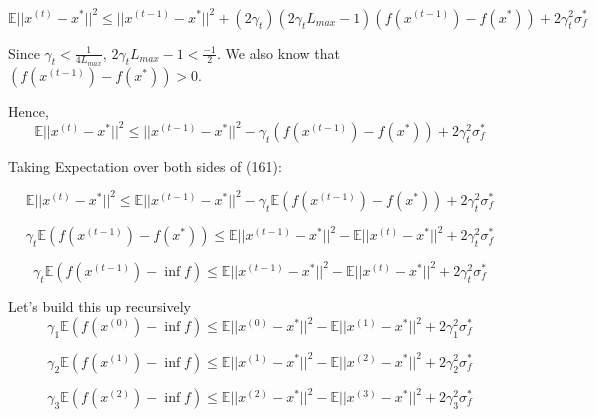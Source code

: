 \begin{equation}
    \mathbb{E}||x^{(t)} - x^*||^2 \leq ||x^{(t - 1)} - x^*||^2 + (2 \gamma_t) (2 \gamma_t L_{max} - 1)(f(x^{(t - 1)}) - f(x^*)) + 2\gamma_t^2 \sigma_f^*
\end{equation}

\noindent Since $\gamma_t < \frac{1}{4L_{max}}$, $2\gamma_t L_{max} - 1 < \frac{-1}{2}$. We also know that $(f(x^{(t - 1)}) - f(x^*)) > 0$. 

\noindent Hence,
\begin{equation}
    \mathbb{E}||x^{(t)} - x^*||^2 \leq ||x^{(t - 1)} - x^*||^2 - \gamma_t (f(x^{(t - 1)}) - f(x^*)) + 2\gamma_t^2 \sigma_f^*
\end{equation}

\noindent Taking Expectation over both sides of (161): 

\begin{equation}
    \mathbb{E}||x^{(t)} - x^*||^2 \leq \mathbb{E} ||x^{(t - 1)} - x^*||^2 - \gamma_t \mathbb{E} (f(x^{(t - 1)}) - f(x^*)) + 2\gamma_t^2 \sigma_f^*
\end{equation}

\begin{equation}
    \gamma_t \mathbb{E} (f(x^{(t - 1)}) - f(x^*)) \leq \mathbb{E} ||x^{(t - 1)} - x^*||^2 - \mathbb{E}||x^{(t)} - x^*||^2 + 2\gamma_t^2 \sigma_f^*
\end{equation}

\begin{equation}
    \gamma_t \mathbb{E} (f(x^{(t - 1)}) - \inf f) \leq \mathbb{E} ||x^{(t - 1)} - x^*||^2 - \mathbb{E}||x^{(t)} - x^*||^2 + 2\gamma_t^2 \sigma_f^*
\end{equation}

\noindent Let's build this up recursively
\begin{equation}
    \gamma_1 \mathbb{E} (f(x^{(0)}) - \inf f) \leq \mathbb{E} ||x^{(0)} - x^*||^2 - \mathbb{E}||x^{(1)} - x^*||^2 + 2\gamma_1^2 \sigma_f^*
\end{equation}

\begin{equation}
    \gamma_2 \mathbb{E} (f(x^{(1)}) - \inf f) \leq \mathbb{E} ||x^{(1)} - x^*||^2 - \mathbb{E}||x^{(2)} - x^*||^2 + 2\gamma_2^2 \sigma_f^*
\end{equation}

\begin{equation}
    \gamma_3 \mathbb{E} (f(x^{(2)}) - \inf f) \leq \mathbb{E} ||x^{(2)} - x^*||^2 - \mathbb{E}||x^{(3)} - x^*||^2 + 2\gamma_3^2 \sigma_f^*
\end{equation}

